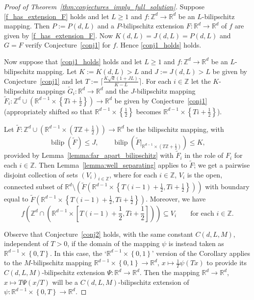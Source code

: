 \documentclass[a4paper, bibliography=totoc]{scrartcl}
\numberwithin{claimcounter}{define}
\newcommand{\R}{\mathbb{R}}
\newcommand{\Z}{\mathbb{Z}}
\newcommand{\ceil}[1]{\lceil#1\rceil}
\newcommand{\bilip}{\operatorname{bilip}}
\newcommand{\set}[1]{\left\{#1\right\}}
\newcommand{\br}[1]{\left(#1\right)}
\newcommand{\sqbr}[1]{\left[#1\right]}
\newcommand{\wt}[1]{\widetilde{#1}}
\begin{document}
\begin{proof}[Proof of Theorem~\ref{thm:conjectures_imply_full_solution}]
	Suppose \eqref{f_has_extension_F} holds and let $L\geq 1$ and $f\colon \Z^{d}\to \R^{d}$ be an $L$-bilipschitz mapping. Then $P:=P(d,L)$ and a $P$-bilipschitz extension $F\colon \R^{d}\to\R^{d}$ of $f$ are given by \eqref{f_has_extension_F}. Now $K(d,L)=J(d,L)=P(d,L)$ and $G=F$ verify Conjecture~\ref{conj1} for $f$. Hence \eqref{conj1_holds} holds.
	
	
	Now suppose that \eqref{conj1_holds} holds and let $L\geq 1$ and $f\colon \Z^{d}\to \R^{d}$ be an $L$-bilipschitz mapping. Let $K:=K(d,L)>L$ and $J:=J(d,L)>L$ be given by Conjecture~\ref{conj1} and let $T:=\ceil{\frac{K\sqrt{d}(1+JL)}{K-L}}$. For each $i\in\Z$ let the $K$-bilipschitz mappings $\wt{G}_{i}\colon \R^{d}\to\R^{d}$ and the $J$-bilipschitz mapping $\wt{F}_{i}\colon\Z^{d}\cup\br{\R^{d-1}\times\set{Ti+\frac{1}{2}}}\to\R^{d}$ be given by Conjecture~\ref{conj1} (appropriately shifted so that $\R^{d-1}\times\set{\frac{1}{2}}$ becomes $\R^{d-1}\times\set{Ti+\frac{1}{2}}$). 
	
	Let $\wt{F}\colon \Z^{d}\cup\br{\R^{d-1}\times\br{T\Z+\frac{1}{2}}}\to\R^{d}$ be the bilipschitz mapping, with
	\begin{equation*}
	\bilip(\wt{F})\leq J,\qquad \bilip(\wt{F}|_{\R^{d-1}\times\br{T\Z+\frac{1}{2}}})\leq K,
	\end{equation*}
	provided by Lemma~\ref{lemma:far_apart_bilipschitz} with $\wt{F}_{i}$ in the role of $F_{i}$ for each $i\in\Z$. Then Lemma~\ref{lemma:well_separating} applies to $\wt{F}$; we get a pairwise disjoint collection of sets $(V_{i})_{i\in\Z}$, where for each $i\in\Z$, $V_{i}$ is the open, connected subset of $\R^{d}\setminus \br{\wt{F}\br{\R^{d-1}\times\set{T(i-1)+\frac{1}{2},Ti+\frac{1}{2}}}}$ with boundary equal to $\wt{F}\br{\R^{d-1}\times\set{T(i-1)+\frac{1}{2},Ti+\frac{1}{2}}}$. Moreover, we have\begin{equation*}
	f\br{\Z^{d}\cap\br{\R^{d-1}\times\sqbr{T(i-1)+\frac{1}{2},Ti+\frac{1}{2}}}}\subseteq V_{i}\qquad\text{for each }i\in\Z.
	\end{equation*}
	
	Observe that Conjecture~\ref{conj2} holds, with the same constant $C(d,L,M)$, independent of $T>0$, if the domain of the mapping $\psi$ is instead taken as $\R^{d-1}\times\set{0,T}$. In this case, the `$\R^{d-1}\times\set{0,1}$' version of the Corollary applies to the $M$-bilipschitz mapping $\R^{d-1}\times\set{0,1}\to\R^{d}$, $x\mapsto \frac{1}{T}\psi(Tx)$ to provide its $C(d,L,M)$-bilipschitz extension $\Psi\colon \R^{d}\to\R^{d}$. Then the mapping $\R^{d}\to\R^{d}$, $x\mapsto T\Psi(x/T)$ will be a $C(d,L,M)$-bilipschitz extension of $\psi\colon \R^{d-1}\times \set{0,T}\to\R^{d}$.  
	

\end{proof}
\end{document}
